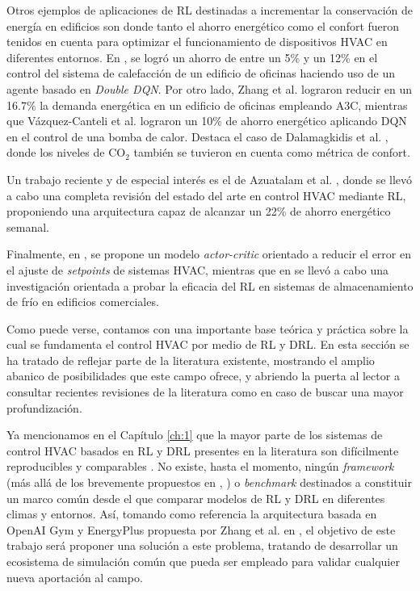 Otros ejemplos de aplicaciones de RL destinadas a incrementar la conservación de energía en edificios son \cite{li2015multi, vazquez2017balancing, vazquez2019fusing, dalamagkidis2007reinforcement, yu2010online, yuan2020study, azuatalam2020reinforcement} donde tanto el ahorro energético como el confort fueron tenidos en cuenta para optimizar el funcionamiento de dispositivos HVAC en diferentes entornos. En \cite{brandi2020deep}, se logró un ahorro de entre un 5\% y un 12\% en el control del sistema de calefacción de un edificio de oficinas haciendo uso de un agente basado en \textit{Double DQN}. Por otro lado, Zhang et al. \cite{zhang2019whole, zhang2018deep} lograron reducir en un 16.7\% la demanda energética en un edificio de oficinas empleando A3C, mientras que Vázquez-Canteli et al. \cite{vazquez2019fusing, vazquez2017balancing} lograron un 10\% de ahorro energético aplicando DQN en el control de una bomba de calor. Destaca el caso de Dalamagkidis et al. \cite{dalamagkidis2007reinforcement}, donde los niveles de CO$_2$ también se tuvieron en cuenta como métrica de confort.

Un trabajo reciente y de especial interés es el de Azuatalam et al. \cite{azuatalam2020reinforcement}, donde se llevó a cabo una completa revisión del estado del arte en control HVAC mediante RL, proponiendo una arquitectura capaz de alcanzar un 22\% de ahorro energético semanal.

Finalmente, en \cite{du2008two}, se propone un modelo \textit{actor-critic} orientado a reducir el error en el ajuste de \textit{setpoints} de sistemas HVAC, mientras que en \cite{henze2003evaluation} se llevó a cabo una investigación orientada a probar la eficacia del RL en sistemas de almacenamiento de frío en edificios comerciales.

Como puede verse, contamos con una importante base teórica y práctica sobre la cual se fundamenta el control HVAC por medio de RL y DRL. En esta sección se ha tratado de reflejar parte de la literatura existente, mostrando el amplio abanico de posibilidades que este campo ofrece, y abriendo la puerta al lector a consultar recientes revisiones de la literatura como \cite{vazquez2019reinforcement, mason2019review} en caso de buscar una mayor profundización.

Ya mencionamos en el Capítulo \ref{ch:1} que la mayor parte de los sistemas de control HVAC basados en RL y DRL presentes en la literatura son difícilmente reproducibles y comparables \cite{vazquez2019reinforcement}. No existe, hasta el momento, ningún \textit{framework} (más allá de los brevemente propuestos en \cite{vazquez2019reinforcement}, \cite{azuatalam2020reinforcement}) o \textit{benchmark} destinados a constituir un marco común desde el que comparar modelos de RL y DRL en diferentes climas y entornos. Así, tomando como referencia la arquitectura basada en OpenAI Gym y EnergyPlus propuesta por Zhang et al. en \cite{zhang2018practical, zhang2019whole}, el objetivo de este trabajo será proponer una solución a este problema, tratando de desarrollar un ecosistema de simulación común que pueda ser empleado para validar cualquier nueva aportación al campo.


